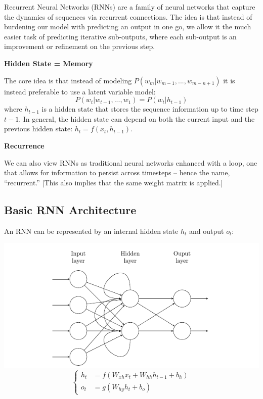 \documentclass[
]{book}
\begin{document}
Recurrent Neural Networks (RNNs) are a family of neural networks that capture the dynamics of sequences via recurrent connections. The idea is that instead of burdening our model with predicting an output in one go, we allow it the much easier task of predicting iterative sub-outputs, where each sub-output is an improvement or refinement on the previous step.

\textbf{Hidden State = Memory}

The core idea is that instead of modeling \(P(w_m | w_{m-1}, ..., w_{m-n+1})\) it is instead preferable to use a latent variable model:
\[
P(w_t | w_{t-1}, ..., w_1)=P(w_t | h_{t-1})
\]
where \(h_{t-1}\) is a hidden state that stores the sequence information up to time step \(t-1\). In general, the hidden state can depend on both the current input and the previous hidden state: \(h_t = f(x_t, h_{t-1})\).

\textbf{Recurrence}

We can also view RNNs as traditional neural networks enhanced with a loop, one that allows for information to persist across timesteps -- hence the name, ``recurrent.'' {[}This also implies that the same weight matrix is applied.{]}

\hypertarget{basic-rnn-architecture}{%
\subsection{Basic RNN Architecture}\label{basic-rnn-architecture}}

An RNN can be represented by an internal hidden state \(h_t\) and output \(o_t\):

\includegraphics{Figures/RNN.png}
\[
\begin{cases}
h_{t} & =f\left(W_{xh}x_{t}+W_{hh}h_{t-1}+b_{h}\right)\\
o_{t} & =g\left(W_{hy}h_{t}+b_{o}\right)
\end{cases}
\]
\end{document}
